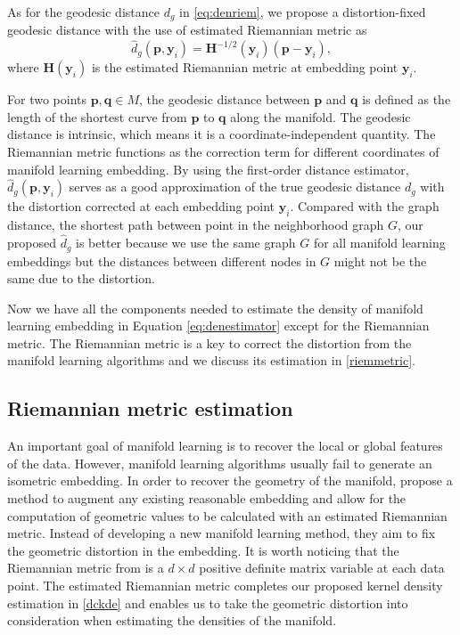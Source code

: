\documentclass[11pt,a4paper,]{article}
\begin{document}
As for the geodesic distance \(d_g\) in \eqref{eq:denriem}, we propose a distortion-fixed geodesic distance with the use of estimated Riemannian metric as
\begin{equation}
\label{eq:dgestimate}
\hat{d}_g(\pmb{p}, \pmb{y}_i) = \pmb{H}^{-1/2}(\pmb{y}_i) (\pmb{p} - \pmb{y}_i),
\end{equation}
where \(\pmb{H}(\pmb{y}_i)\) is the estimated Riemannian metric at embedding point \(\pmb{y}_i\).

For two points \(\pmb{p},\pmb{q} \in M\), the geodesic distance between \(\pmb{p}\) and \(\pmb{q}\) is defined as the length of the shortest curve from \(\pmb{p}\) to \(\pmb{q}\) along the manifold.
The geodesic distance is intrinsic, which means it is a coordinate-independent quantity. The Riemannian metric functions as the correction term for different coordinates of manifold learning embedding.
By using the first-order distance estimator, \(\hat{d}_g(\pmb{p}, \pmb{y}_i)\) serves as a good approximation of the true geodesic distance \(d_g\) with the distortion corrected at each embedding point \(\pmb{y}_i\). Compared with the graph distance, the shortest path between point in the neighborhood graph \(G\), our proposed \(\hat{d}_g\) is better because we use the same graph \(G\) for all manifold learning embeddings but the distances between different nodes in \(G\) might not be the same due to the distortion.

Now we have all the components needed to estimate the density of manifold learning embedding in Equation \eqref{eq:denestimator} except for the Riemannian metric. The Riemannian metric is a key to correct the distortion from the manifold learning algorithms and we discuss its estimation in \autoref{riemmetric}.

\hypertarget{riemmetric}{%
\subsection{Riemannian metric estimation}\label{riemmetric}}

An important goal of manifold learning is to recover the local or global features of the data. However, manifold learning algorithms usually fail to generate an isometric embedding.
In order to recover the geometry of the manifold, \textcite{Perrault-Joncas2013-pq} propose a method to augment any existing reasonable embedding and allow for the computation of geometric values to be calculated with an estimated Riemannian metric. Instead of developing a new manifold learning method, they aim to fix the geometric distortion in the embedding. It is worth noticing that the Riemannian metric from \textcite{Perrault-Joncas2013-pq} is a \(d\times d\) positive definite matrix variable at each data point. The estimated Riemannian metric completes our proposed kernel density estimation in \autoref{dckde} and enables us to take the geometric distortion into consideration when estimating the densities of the manifold.
\end{document}
